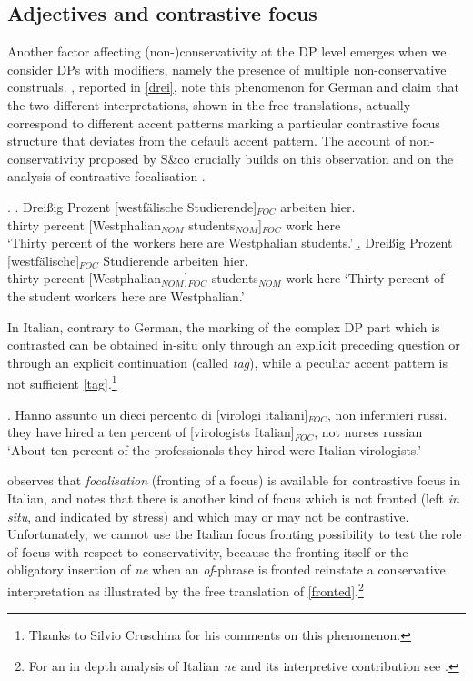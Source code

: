 \documentclass[charis, linguex]{glossa}
\begin{document}
\subsection{Adjectives and contrastive focus} \label{SubSec-Adjectives-Focus}

Another factor affecting (non-)conservativity at the DP level emerges when we
consider DPs with modifiers, namely the presence of multiple non-conservative
construals. \citealt[ex.82]{pas22}, reported in \ref{drei}, note this phenomenon
for German and claim that the two different interpretations, shown in the free
translations, actually correspond to different accent patterns marking a
particular contrastive focus structure that deviates from the default accent
pattern. The account of non-conservativity proposed by S\&co crucially builds
on this observation and on the analysis of contrastive focalisation
\citep{roo85}.

\ex. \label{drei}\ag. Dreißig Prozent [westfälische Studierende]$_{FOC}$ arbeiten hier. \\
          thirty percent [Westphalian$_{NOM}$ students$_{NOM}$]$_{FOC}$ work here \\
		  \glt ‘Thirty percent of the workers here are Westphalian students.’
     \b. Dreißig Prozent [westfälische]$_{FOC}$ Studierende arbeiten hier. \\
	     thirty percent [Westphalian$_{NOM}$]$_{FOC}$ students$_{NOM}$ work here
		 \glt ‘Thirty percent of the student workers here are Westphalian.’




In Italian, contrary to German, the marking of the complex DP part which is contrasted can be obtained in-situ only through an explicit preceding question or through an explicit continuation (called \textit{tag}), while a peculiar accent pattern is not sufficient \ref{tag}.\footnote{Thanks to Silvio Cruschina for his comments on this phenomenon.}


\exg. Hanno assunto un dieci percento di [virologi italiani]$_{FOC}$, non infermieri russi.\\ 
{they have} hired a ten percent of [virologists Italian]$_{FOC}$, not nurses russian \\
	\glt   `About ten percent of the professionals they hired were Italian virologists.' \label{tag}	

\citet{riz97} observes that \textit{focalisation} (fronting of a focus) is  available for contrastive focus in Italian, and notes that there is another kind of focus which is not fronted (left \textit{in situ}, and indicated by stress) and which may or may not be contrastive. Unfortunately, we cannot use the Italian focus fronting possibility to test the role of focus with respect to conservativity, because the fronting itself or the obligatory insertion of \textit{ne} when an \textit{of}-phrase is fronted reinstate a conservative interpretation as illustrated by the free translation of \ref{fronted}.\footnote{For an in depth analysis of Italian \textit{ne} and its interpretive contribution see \citet{fal16, fal23}.}
\end{document}
